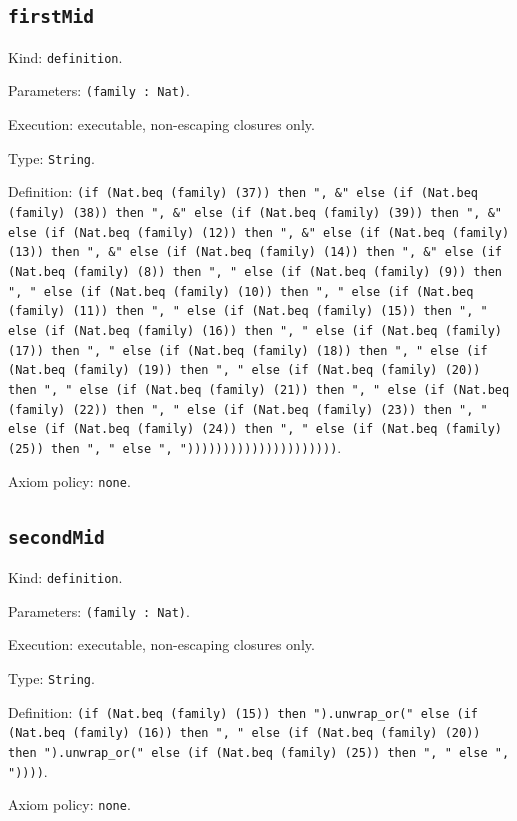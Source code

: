 \documentclass[11pt]{article}
\begin{document}
\subsection*{\texttt{firstMid}}
\noindent Kind: \texttt{definition}.\par
\noindent Parameters: \texttt{(family : Nat)}.\par
\noindent Execution: executable, non-escaping closures only.\par
\noindent Type: \texttt{String}.\par
\noindent Definition: \texttt{(if (Nat.beq (family) (37)) then ", \&" else (if (Nat.beq (family) (38)) then ", \&" else (if (Nat.beq (family) (39)) then ", \&" else (if (Nat.beq (family) (12)) then ", \&" else (if (Nat.beq (family) (13)) then ", \&" else (if (Nat.beq (family) (14)) then ", \&" else (if (Nat.beq (family) (8)) then ", " else (if (Nat.beq (family) (9)) then ", " else (if (Nat.beq (family) (10)) then ", " else (if (Nat.beq (family) (11)) then ", " else (if (Nat.beq (family) (15)) then ", " else (if (Nat.beq (family) (16)) then ", " else (if (Nat.beq (family) (17)) then ", " else (if (Nat.beq (family) (18)) then ", " else (if (Nat.beq (family) (19)) then ", " else (if (Nat.beq (family) (20)) then ", " else (if (Nat.beq (family) (21)) then ", " else (if (Nat.beq (family) (22)) then ", " else (if (Nat.beq (family) (23)) then ", " else (if (Nat.beq (family) (24)) then ", " else (if (Nat.beq (family) (25)) then ", " else ", ")))))))))))))))))))))}.\par
\noindent Axiom policy: \texttt{none}.\par
\subsection*{\texttt{secondMid}}
\noindent Kind: \texttt{definition}.\par
\noindent Parameters: \texttt{(family : Nat)}.\par
\noindent Execution: executable, non-escaping closures only.\par
\noindent Type: \texttt{String}.\par
\noindent Definition: \texttt{(if (Nat.beq (family) (15)) then ").unwrap\_or(" else (if (Nat.beq (family) (16)) then ", " else (if (Nat.beq (family) (20)) then ").unwrap\_or(" else (if (Nat.beq (family) (25)) then ", " else ", "))))}.\par
\noindent Axiom policy: \texttt{none}.\par
\end{document}
